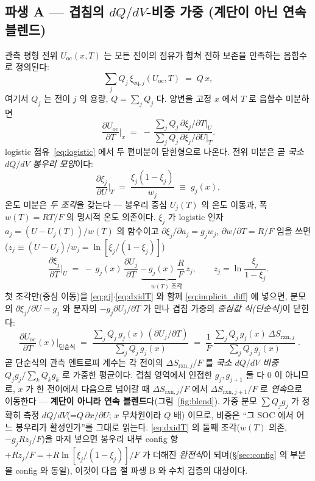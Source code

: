 \documentclass[11pt,a4paper]{article}
\newcommand{\rxn}{\mathrm{rxn}}
\newcommand{\eq}{\mathrm{eq}}
\newcommand{\oc}{\mathrm{oc}}
\begin{document}
\subsection{파생 A — 겹침의 $dQ/dV$-비중 가중 (계단이 아닌 연속 블렌드)}\label{ssec:overlap}
관측 평형 전위 $U_\oc(x,T)$ 는 모든 전이의 점유가 합쳐 전하 보존을 만족하는 음함수로 정의된다:
\begin{equation}
\sum_j Q_j\,\xi_{\eq,j}(U_\oc,T) \;=\; Q\,x,
\label{eq:implicit}
\end{equation}
여기서 $Q_j$ 는 전이 $j$ 의 용량, $Q=\sum_j Q_j$ 다. 양변을 고정 $x$ 에서 $T$ 로 음함수 미분하면
\begin{equation}
\frac{\partial U_\oc}{\partial T}\Big|_x
\;=\; -\,\frac{\sum_j Q_j\,\partial\xi_j/\partial T|_U}{\sum_j Q_j\,\partial\xi_j/\partial U|_T}.
\label{eq:implicit_diff}
\end{equation}
logistic 점유~\eqref{eq:logistic} 에서 두 편미분이 닫힌형으로 나온다. 전위 미분은 곧 \emph{국소 $dQ/dV$ 봉우리
모양}이다:
\begin{equation}
\frac{\partial\xi_j}{\partial U}\Big|_T \;=\; \frac{\xi_j(1-\xi_j)}{w_j} \;\equiv\; g_j(x),
\label{eq:gj}
\end{equation}
온도 미분은 \emph{두 조각}을 갖는다 — 봉우리 중심 $U_j(T)$ 의 온도 이동과, 폭 $w(T)=RT/F$ 의 명시적 온도
의존이다. $\xi_j$ 가 logistic 인자 $a_j=(U-U_j(T))/w(T)$ 의 함수이고 $\partial\xi_j/\partial a_j=g_j w_j$,
$\partial w/\partial T=R/F$ 임을 쓰면($z_j\equiv(U-U_j)/w_j=\ln[\xi_j/(1-\xi_j)]$)
\begin{equation}
\frac{\partial\xi_j}{\partial T}\Big|_U
\;=\; -\,g_j(x)\,\frac{\partial U_j}{\partial T}
\;\underbrace{-\,g_j(x)\,\frac{R}{F}\,z_j}_{w(T)\text{ 조각}},
\qquad z_j=\ln\frac{\xi_j}{1-\xi_j}.
\label{eq:dxidT}
\end{equation}
첫 조각만(중심 이동)을 \eqref{eq:gj}$\cdot$\eqref{eq:dxidT} 와 함께 \eqref{eq:implicit_diff} 에 넣으면, 분모의
$\partial\xi_j/\partial U=g_j$ 와 분자의 $-g_j\partial U_j/\partial T$ 가 만나 겹침 가중의 \emph{중심값 식(단순식)}이
닫힌다:
\begin{equation}
\boxed{\;\frac{\partial U_\oc}{\partial T}(x)\Big|_{\text{단순식}}
\;=\; \frac{\sum_j Q_j\,g_j(x)\,(\partial U_j/\partial T)}{\sum_j Q_j\,g_j(x)}
\;=\; \frac1F\,\frac{\sum_j Q_j\,g_j(x)\,\Delta S_{\rxn,j}}{\sum_j Q_j\,g_j(x)}\;.}
\label{eq:weighted}
\end{equation}
곧 단순식의 관측 엔트로피 계수는 각 전이의 $\Delta S_{\rxn,j}/F$ 를 \emph{국소 $dQ/dV$ 비중}
$Q_jg_j/\sum_k Q_kg_k$ 로 가중한 평균이다. 겹침 영역에서 인접한 $g_j,g_{j+1}$ 둘 다 0 이 아니므로, $x$ 가 한
전이에서 다음으로 넘어갈 때 $\Delta S_{\rxn,j}/F$ 에서 $\Delta S_{\rxn,j+1}/F$ 로 \emph{연속}으로 이동한다 —
\textbf{계단이 아니라 연속 블렌드}다(그림~\ref{fig:blend}). 가중 분모 $\sum Q_jg_j$ 가 정확히 측정 $dQ/dV$(=$Q\,\partial x/\partial U$; $x$ 무차원이라 $Q$ 배)
이므로, 비중은 ``그 SOC 에서 어느 봉우리가 활성인가''를 그대로 읽는다. \eqref{eq:dxidT} 의 둘째 조각($w(T)$
의존, $-g_jRz_j/F$)을 마저 넣으면 봉우리 내부 config 항 $+R z_j/F=+R\ln[\xi_j/(1-\xi_j)]/F$ 가 더해진
\emph{완전식}이 되며(\S\ref{sec:config} 의 부분몰 config 와 동일), 이것이 다음 절 파생 B 와 수치 검증의 대상이다.
\end{document}
